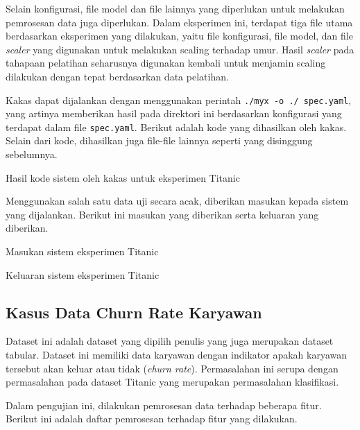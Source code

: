 Selain konfigurasi, file model dan file lainnya yang diperlukan untuk melakukan pemrosesan data juga diperlukan.
Dalam eksperimen ini, terdapat tiga file utama berdasarkan eksperimen yang dilakukan, yaitu file konfigurasi, file model, dan file \textit{scaler} yang digunakan untuk melakukan scaling terhadap umur.
Hasil \textit{scaler} pada tahapaan pelatihan seharusnya digunakan kembali untuk menjamin scaling dilakukan dengan tepat berdasarkan data pelatihan.

Kakas dapat dijalankan dengan menggunakan perintah \texttt{./myx -o ./ spec.yaml}, yang artinya memberikan hasil pada direktori ini berdasarkan konfigurasi yang terdapat dalam file \texttt{spec.yaml}.
Berikut adalah kode yang dihasilkan oleh kakas.
Selain dari kode, dihasilkan juga file-file lainnya seperti yang disinggung sebelumnya.

\begin{code}
	\caption{Hasil kode sistem oleh kakas untuk eksperimen Titanic}
	\label{listing:19}
\end{code}

Menggunakan salah satu data uji secara acak, diberikan masukan kepada sistem yang dijalankan.
Berikut ini masukan yang diberikan serta keluaran yang diberikan.

\begin{code}
	\caption{Masukan sistem eksperimen Titanic}
	\label{listing:20}
\end{code}

\begin{code}
	\caption{Keluaran sistem eksperimen Titanic}
	\label{listing:21}
\end{code}

\subsection{Kasus Data Churn Rate Karyawan}

Dataset ini adalah dataset yang dipilih penulis yang juga merupakan dataset tabular.
Dataset ini memiliki data karyawan dengan indikator apakah karyawan tersebut akan keluar atau tidak (\textit{churn rate}).
Permasalahan ini serupa dengan permasalahan pada dataset Titanic yang merupakan permasalahan klasifikasi.

Dalam pengujian ini, dilakukan pemrosesan data terhadap beberapa fitur.
Berikut ini adalah daftar pemrosesan terhadap fitur yang dilakukan.

